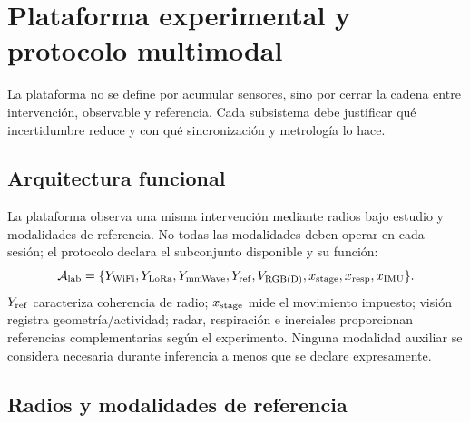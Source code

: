 \chapter{Plataforma experimental y protocolo multimodal}
\label{ch:platform}

La plataforma no se define por acumular sensores, sino por cerrar la cadena entre
intervención, observable y referencia. Cada subsistema debe justificar qué
incertidumbre reduce y con qué sincronización y metrología lo hace.

\section{Arquitectura funcional}

La plataforma observa una misma intervención mediante radios bajo estudio y modalidades de referencia. No todas las modalidades deben operar en cada sesión; el protocolo declara el subconjunto disponible y su función:
\begin{equation}
\mathcal A_{\rm lab}=\{Y_{\rm WiFi},Y_{\rm LoRa},Y_{\rm mmWave},
Y_{\rm ref},V_{\rm RGB(D)},x_{\rm stage},x_{\rm resp},x_{\rm IMU}\}.
\end{equation}
$Y_{\rm ref}$ caracteriza coherencia de radio; $x_{\rm stage}$ mide el movimiento impuesto; visión registra geometría/actividad; radar, respiración e inerciales proporcionan referencias complementarias según el experimento. Ninguna modalidad auxiliar se considera necesaria durante inferencia a menos que se declare expresamente.

\section{Radios y modalidades de referencia}

